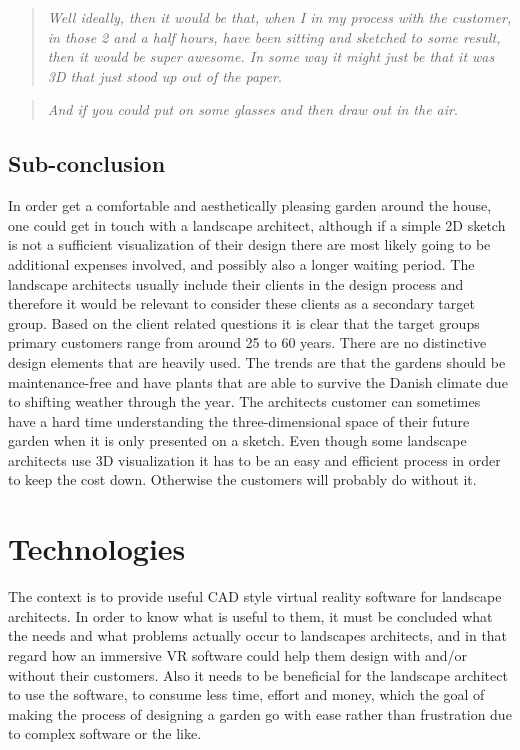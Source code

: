 		\begin{quote}
			\textit{Well ideally, then it would be that, when I in my process with the customer, in those 2 and a half hours, have been sitting and sketched to some result, then it would be super awesome. In some way it might just be that it was 3D that just stood up out of the paper}\label{quote:expertIdeas3}.\\
		\end{quote}
		
		\begin{quote}
			\textit{And if you could put on some glasses and then draw out in the air}\label{quote:expertIdeas4}.\\
		\end{quote}
		
	\subsection{Sub-conclusion}
		In order get a comfortable and aesthetically pleasing garden around the house, one could get in touch with a landscape architect, although if a simple 2D sketch is not a sufficient visualization of their design there are most likely going to be additional expenses involved, and possibly also a longer waiting period.
		The landscape architects usually include their clients in the design process and therefore it would be relevant to consider these clients as a secondary target group. Based on the client related questions it is clear that the target groups primary customers range from around 25 to 60 years. There are no distinctive design elements that are heavily used. The trends are that the gardens should be maintenance-free and have plants that are able to survive the Danish climate due to shifting weather through the year. The architects customer can sometimes have a hard time understanding the three-dimensional space of their future garden when it is only presented on a sketch. Even though some landscape architects use 3D visualization it has to be an easy and efficient process in order to keep the cost down. Otherwise the customers will probably do without it.
		
	\section{Technologies}\label{sec:technologies}
		The context is to provide useful CAD style virtual reality software for landscape architects. In order to know what is useful to them, it must be concluded what the needs and what problems actually occur to landscapes architects, and in that regard how an immersive VR software could help them design with and/or without their customers. Also it needs to be beneficial for the landscape architect to use the software, to consume less time, effort and money, which the goal of making the process of designing a garden go with ease rather than frustration due to complex software or the like.\\
	
